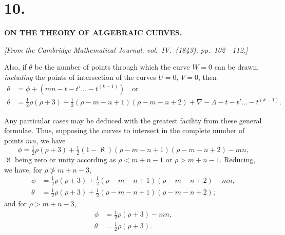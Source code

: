 \documentclass[11pt,a4paper]{article}
\theoremstyle{plain}
\theoremstyle{definition}
\theoremstyle{remark}
\begin{document}
\setlength{\parindent}{1.5em}
\setlength{\parskip}{0pt}
\thispagestyle{empty}
\newpage
\setcounter{page}{53}


\section*{10.}
\begin{center}
\textbf{ON THE THEORY OF ALGEBRAIC CURVES.}
\end{center}
\textit{[From the Cambridge Mathematical Journal, vol.\ IV.\ (1843), pp.\ 102---112.]}

\vspace{6pt}

Also, if $\theta$ be the number of points through which the curve $W=0$ can be drawn,
\textit{including} the points of intersection of the curves $U=0$, $V=0$, then
\begin{align*}
\theta &= \phi + (mn - t - t' \ldots - t^{(k-1)}) \quad\text{or}\\
\theta &= \tfrac{1}{2}\rho(\rho+3) + \tfrac{1}{2}(\rho-m-n+1)(\rho-m-n+2)
+ \nabla - \Lambda - t - t' \ldots - t^{(k-1)} \tag{13}.
\end{align*}

Any particular cases may be deduced with the greatest facility from these general
formulae. Thus, supposing the curves to intersect in the complete number of points $mn$,
we have
\[
\phi = \tfrac{1}{2}\rho(\rho+3) + \tfrac{1}{2}(1-\aleph)(\rho-m-n+1)(\rho-m-n+2) - mn,
\]
$\aleph$ being zero or unity according as $\rho < m+n-1$ or $\rho > m+n-1$.
Reducing, we have, for $\rho \not> m+n-3$,
\begin{align*}
\phi &= \tfrac{1}{2}\rho(\rho+3) + \tfrac{1}{2}(\rho-m-n+1)(\rho-m-n+2) - mn, \\
\theta &= \tfrac{1}{2}\rho(\rho+3) + \tfrac{1}{2}(\rho-m-n+1)(\rho-m-n+2);
\end{align*}
and for $\rho > m+n-3$,
\begin{align*}
\phi &= \tfrac{1}{2}\rho(\rho+3) - mn, \\
\theta &= \tfrac{1}{2}\rho(\rho+3).
\end{align*}
\end{document}
